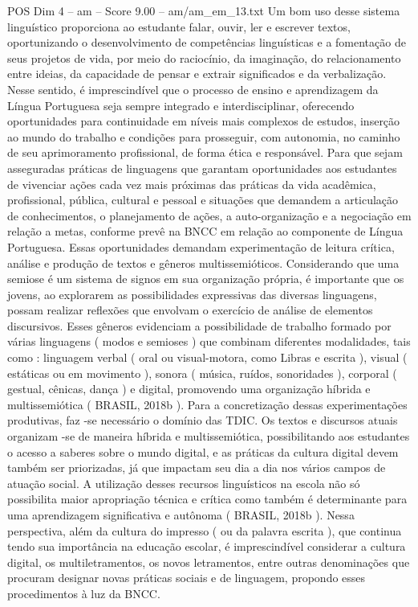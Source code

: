 \begin{textsample}{POS Dim 4 – am – Score 9.00 – am/am\_em\_13.txt}
Um bom uso desse sistema linguístico proporciona ao estudante falar, ouvir, ler e escrever textos, oportunizando o desenvolvimento de competências linguísticas e a fomentação de seus projetos de vida, por meio do raciocínio, da imaginação, do relacionamento entre ideias, da capacidade de pensar e extrair significados e da verbalização.
Nesse sentido, é imprescindível que o processo de ensino e aprendizagem da Língua Portuguesa seja sempre integrado e interdisciplinar, oferecendo oportunidades para continuidade em níveis mais complexos de estudos, inserção ao mundo do trabalho e condições para prosseguir, com autonomia, no caminho de seu aprimoramento profissional, de forma ética e responsável.
Para que sejam asseguradas práticas de linguagens que garantam oportunidades aos estudantes de vivenciar ações cada vez mais próximas das práticas da vida acadêmica, profissional, pública, cultural e pessoal e situações que demandem a articulação de conhecimentos, o planejamento de ações, a auto-organização e a negociação em relação a metas, conforme prevê na BNCC em relação ao componente de Língua Portuguesa.
Essas oportunidades demandam experimentação de leitura crítica, análise e produção de textos e gêneros multissemióticos.
Considerando que uma semiose é um sistema de signos em sua organização própria, é importante que os jovens, ao explorarem as possibilidades expressivas das diversas linguagens, possam realizar reflexões que envolvam o exercício de análise de elementos discursivos.
Esses gêneros evidenciam a possibilidade de trabalho formado por várias linguagens ( modos e semioses ) que combinam diferentes modalidades, tais como : linguagem verbal ( oral ou visual-motora, como Libras e escrita ), visual ( estáticas ou em movimento ), sonora ( música, ruídos, sonoridades ), corporal ( gestual, cênicas, dança ) e digital, promovendo uma organização híbrida e multissemiótica ( BRASIL, 2018b ).
Para a concretização dessas experimentações produtivas, faz -se necessário o domínio das TDIC.
Os textos e discursos atuais organizam -se de maneira híbrida e multissemiótica, possibilitando aos estudantes o acesso a saberes sobre o mundo digital, e as práticas da cultura digital devem também ser priorizadas, já que impactam seu dia a dia nos vários campos de atuação social.
A utilização desses recursos linguísticos na escola não só possibilita maior apropriação técnica e crítica como também é determinante para uma aprendizagem significativa e autônoma ( BRASIL, 2018b ).
Nessa perspectiva, além da cultura do impresso ( ou da palavra escrita ), que continua tendo sua importância na educação escolar, é imprescindível considerar a cultura digital, os multiletramentos, os novos letramentos, entre outras denominações que procuram designar novas práticas sociais e de linguagem, propondo esses procedimentos à luz da BNCC.

\end{textsample}
